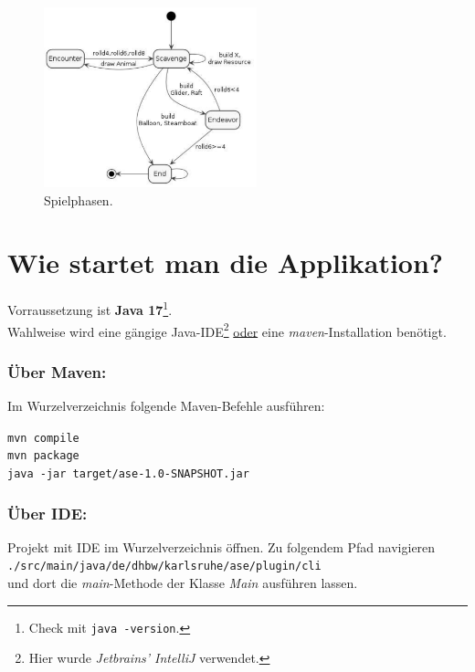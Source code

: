 \begin{figure}
	\centering
	\includegraphics[width=0.55\textwidth]{Bilder/game-phases.png} 
	\caption{Spielphasen.}
	\label{fig:phases}
\end{figure} 

\section{Wie startet man die Applikation?}

Vorraussetzung ist \textbf{Java 17}\footnote{Check mit \texttt{java -version}.}. \\ 
Wahlweise wird eine gängige Java-IDE\footnote{Hier wurde \textit{Jetbrains' IntelliJ} verwendet.} 
\underline{oder} eine \textit{maven}-Installation benötigt.

\subsubsection{Über Maven:} 

Im Wurzelverzeichnis folgende Maven-Befehle ausführen:

\texttt{mvn compile} \\
\texttt{mvn package} \\ 
\texttt{java -jar target/ase-1.0-SNAPSHOT.jar} \\ 
 

\subsubsection{Über IDE:}

Projekt mit IDE im Wurzelverzeichnis öffnen. 
Zu folgendem Pfad navigieren \\ 
\texttt{./src/main/java/de/dhbw/karlsruhe/ase/plugin/cli} \\
und dort die \textit{main}-Methode der Klasse \textit{Main} ausführen lassen.

